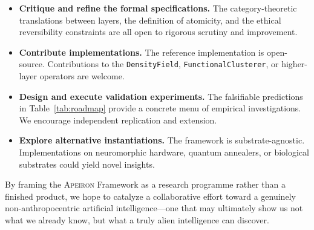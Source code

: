 \begin{itemize}
    \item \textbf{Critique and refine the formal specifications.} The category-theoretic translations between layers, the definition of atomicity, and the ethical reversibility constraints are all open to rigorous scrutiny and improvement.
    \item \textbf{Contribute implementations.} The reference implementation is open-source. Contributions to the \texttt{DensityField}, \texttt{FunctionalClusterer}, or higher-layer operators are welcome.
    \item \textbf{Design and execute validation experiments.} The falsifiable predictions in Table~\ref{tab:roadmap} provide a concrete menu of empirical investigations. We encourage independent replication and extension.
    \item \textbf{Explore alternative instantiations.} The framework is substrate-agnostic. Implementations on neuromorphic hardware, quantum annealers, or biological substrates could yield novel insights.
\end{itemize}

By framing the \textsc{Apeiron} Framework as a research programme rather than a finished product, we hope to catalyze a collaborative effort toward a genuinely non-anthropocentric artificial intelligence---one that may ultimately show us not what we already know, but what a truly alien intelligence can discover.
